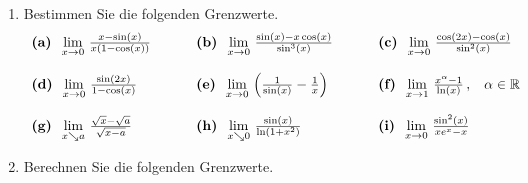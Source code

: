 \begin{ueb}
	{}{    }
	\begin{enumerate}
		\item Bestimmen Sie die folgenden Grenzwerte.
		      \begin{displaymath}
			      \begin{array}{lll}
				      \mbox{\bf (a)} \;\; \lim\limits_{x\rightarrow 0} \, \frac{x-\sin (x)}{x(1-\cos (x))} \hspace*{0.8cm} &
				      \mbox{\bf (b)} \;\; \lim\limits_{x\rightarrow 0} \, \frac{\sin (x)-x\cos (x)}{\sin^3(x)}
				      \hspace*{0.8cm}                                                                                      &
				      \mbox{\bf (c)} \;\; \lim\limits_{x\rightarrow 0} \, \frac{\cos (2x)-\cos (x)}{\sin^2(x)}                                  \\
				                                                                                                           &   &                \\
				      \mbox{\bf (d)} \;\; \lim\limits_{x\rightarrow 0} \, \frac{\sin(2x)}{1-\cos (x)}                      &
				      \mbox{\bf (e)} \;\; \lim\limits_{x\rightarrow 0} \, \Big( \frac{1}{\sin (x)}-\frac{1}{x}\Big)        &
				      \mbox{\bf (f)} \;\; \lim\limits_{x\rightarrow 1} \, \frac{x^\alpha -1}{\ln (x)} \, , \hspace{0.3cm} \alpha \in \mathbb{R} \\
				                                                                                                           &   &                \\
				      \mbox{\bf (g)} \;\; \lim\limits_{x\searrow a} \, \frac{\sqrt{x}-\sqrt{a}}{\sqrt{x-a}}                &
				      \mbox{\bf (h)} \;\; \lim\limits_{x\searrow 0} \, \frac{\sin (x)}{\ln (1+x^2)}                        &
				      \mbox{\bf (i)} \;\; \lim\limits_{x\rightarrow 0} \, \frac{\sin^2 (x)}{xe^x-x}
			      \end{array}
		      \end{displaymath}
		\item Berechnen Sie die folgenden Grenzwerte.
		      \begin{displaymath}
			      \begin{array}{lll}

\end{array}
\end{displaymath}
\end{enumerate}
\end{ueb}
